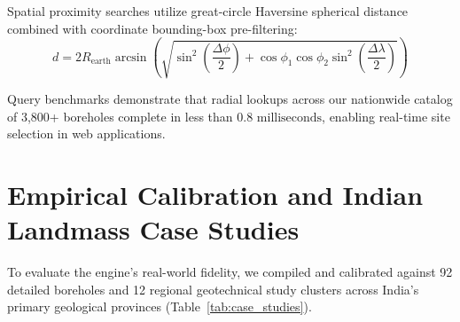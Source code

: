 \documentclass[11pt,a4paper]{article}
\begin{document}
Spatial proximity searches utilize great-circle Haversine spherical distance combined with coordinate bounding-box pre-filtering:
\begin{equation}
d = 2 R_{\text{earth}} \arcsin \left(\sqrt{\sin^2\left(\frac{\Delta \phi}{2}\right) + \cos \phi_1 \cos \phi_2 \sin^2\left(\frac{\Delta \lambda}{2}\right)}\right)
\end{equation}

Query benchmarks demonstrate that radial lookups across our nationwide catalog of 3,800+ boreholes complete in less than $0.8\text{ milliseconds}$, enabling real-time site selection in web applications.

\section{Empirical Calibration and Indian Landmass Case Studies}

To evaluate the engine's real-world fidelity, we compiled and calibrated against 92 detailed boreholes and 12 regional geotechnical study clusters across India's primary geological provinces (Table~\ref{tab:case_studies}).

\begin{table}[htbp]
\centering
\caption{Geotechnical characteristics and stratigraphic profiles across evaluated Indian and benchmark case study sites.}
\label{tab:case_studies}
\end{table}
\end{document}
